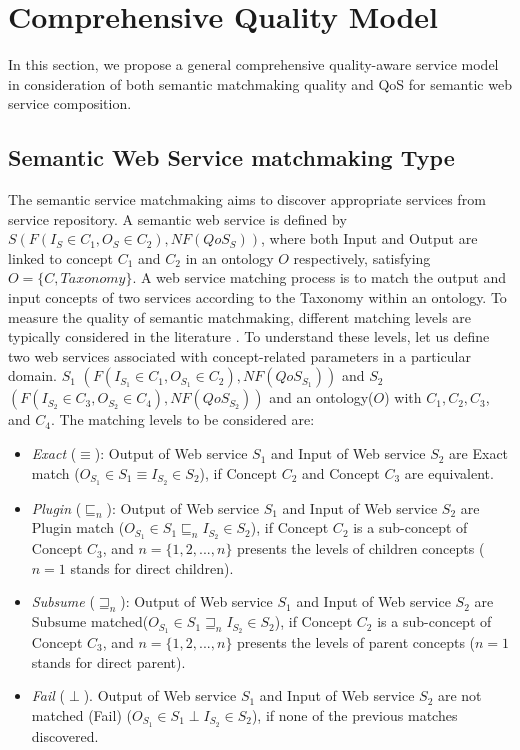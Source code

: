 \documentclass{IEEEtran}
\begin{document}
\section{Comprehensive Quality Model}\label{qswsc_approach}
In this section, we propose a general comprehensive quality-aware service model in consideration of both semantic matchmaking quality and QoS for semantic web service composition.

\subsection{Semantic Web Service matchmaking Type}\label{semantic Web service Discovery}
The semantic service matchmaking aims to discover appropriate services from service repository. A semantic web service is defined by $S(F(I_{S}\in C_{1}, O_{S}\in C_{2}), NF(QoS_{S}))$, where both Input and Output are linked to concept $C_{1}$ and $C_{2}$ in an ontology $O$ respectively, satisfying $O=\{C, Taxonomy\}$. A web service matching process is to match the output and input concepts of two services according to the Taxonomy within an ontology. To measure the quality of semantic matchmaking, different matching levels are typically considered in the literature \cite{paolucci2002semantic}. To understand these levels, let us define two web services associated with concept-related parameters in a particular domain. $S_{1}$ $(F(I_{S_1}\in C_{1}, O_{S_1}\in C_{2}), NF(QoS_{S_1}))$ and  $S_{2}$ $(F(I_{S_2}\in C_{3}, O_{S_2}\in C_{4}), NF(QoS_{S_2}))$ and an ontology($O$) with $C_{1},C_{2},C_{3}$, and $C_{4}$. The matching levels to be considered are:

\begin{itemize}
\item \textit{Exact} ($\equiv$): Output of Web service $S_{1}$ and Input of Web service $S_{2}$ are Exact match ($ O_{S_1} \in S_{1} \equiv I_{S_2} \in S_{2}$), if  Concept $C_{2}$ and Concept $C_{3}$ are equivalent.
\item \textit{Plugin} ($\sqsubseteq_{n}$): Output of Web service $S_{1}$ and Input of Web service $S_{2}$ are Plugin match ($O_{S_1} \in S_{1} \sqsubseteq_{n} I_{S_2} \in S_{2}$), if  Concept $C_{2}$ is a sub-concept of Concept $C_{3}$, and $n = \{1,2,...,n \}$ presents the levels of children concepts ($n=1$ stands for direct children).
\item \textit{Subsume} ($\sqsupseteq_{n}$): Output of Web service $S_{1}$ and Input of Web service $S_{2}$ are Subsume matched($O_{S_1} \in S_{1} \sqsupseteq_{n} I_{S_2} \in S_{2}$), if  Concept $C_{2}$ is a sub-concept of  Concept $C_{3}$, and $n = \{1,2,...,n \}$ presents the levels of parent concepts ($n=1$ stands for direct parent).
\item \textit{Fail} ($\perp$). Output of Web service $S_{1}$ and Input of Web service $S_{2}$ are not matched (Fail) ($O_{S_1} \in S_{1} \perp I_{S_2} \in S_{2}$), if none of the previous matches discovered.
\end{itemize}
\end{document}
